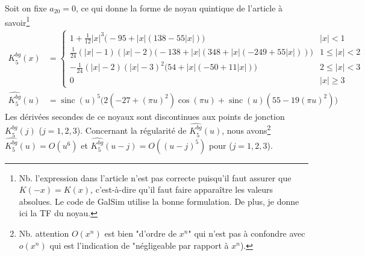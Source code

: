 \documentclass[11pt,twoside]{article}
\DeclareMathOperator{\sinc}{sinc}
\newcommand{\nn}{\nonumber}
\begin{document}
Soit on fixe $a_{20}=0$, ce qui donne la forme de noyau quintique de l'article \cite{2014PASP..126..287B} à savoir\footnote{Nb. l'expression dans l'article n'est pas correcte puisqu'il faut assurer que $K(-x)=K(x)$, c'est-à-dire qu'il faut faire apparaître les valeurs absolues. Le code de \textsf{GalSim} utilise la bonne formulation. De plus, je donne ici la TF du noyau.}
\begin{align}
K^{bg}_5(x) &= \begin{cases}
1 + \frac{1}{12}|x|^3 \Big(-95+|x|(138-55|x|)\Big) & |x|< 1 \\
\frac{1}{24}(|x|-1)(|x|-2)\Big(-138+|x|(348+|x|(-249+55|x|))\Big)& 1\leq |x|<2 \\
-\frac{1}{24}(|x|-2)(|x|-3)^2\Big(54+|x|(-50+11|x|)\Big) & 2\leq |x|<3 \nn \\
0 & |x| \geq 3
\end{cases}\\
\widehat{K^{bg}_5}(u)&=\sinc(u)^5 \Big(2(-27+(\pi u)^2)\cos(\pi u)+\sinc(u)(55-19(\pi u)^2)\Big)
\label{eq:quinticBG-kernel}
\end{align}
Les dérivées secondes de ce noyaux sont discontinues aux points de jonction $K^{bg}_5(j)$ ($j=1,2,3$). Concernant la régularité de $\widehat{K^{bg}_5}(u)$, nous avons\footnote{Nb. attention $O(x^n)$ est bien "d'ordre de $x^n$" qui n'est pas à confondre avec $o(x^n)$ qui est l'indication de "négligeable par rapport à $x^n$).} $\widehat{K^{bg}_5}(u)=O(u^6)$ et $\widehat{K^{bg}_5}(u-j)=O((u-j)^5)$ pour ($j=1,2,3$). 
\end{document}
